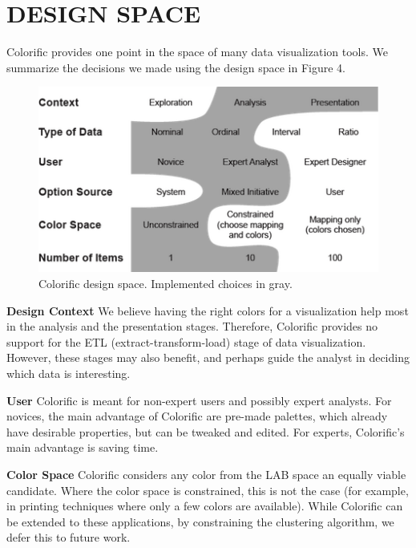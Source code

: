 \documentclass{chi2011}
\newcommand{\system}{Colorific\xspace}
\begin{document}
\section{DESIGN SPACE}
\system provides one point in the space of many data visualization tools. We summarize the decisions we made using the design space in Figure 4. 

\begin{figure}[htb]
\label{design-space}
\includegraphics[scale=0.9]{design_space.png}
\caption{\system design space. Implemented choices in gray.}
\end{figure}
\textbf{Design Context} We believe having the right colors for a visualization help most in the analysis and the presentation stages. Therefore, \system provides no support for the ETL (extract-transform-load) stage of data visualization. However, these stages may also benefit, and perhaps guide the analyst in deciding which data is interesting.

\textbf{User} \system is meant for non-expert users and possibly expert analysts. For novices, the main advantage of \system are pre-made palettes, which already have desirable properties, but can be tweaked and edited. For experts, \system's main advantage is saving time. 

\textbf{Color Space} \system considers any color from the LAB space an equally viable candidate. Where the color space is constrained, this is not the case (for example, in printing techniques where only a few colors are available). While \system can be extended to these applications, by constraining the clustering algorithm, we defer this to future work.
\end{document}
